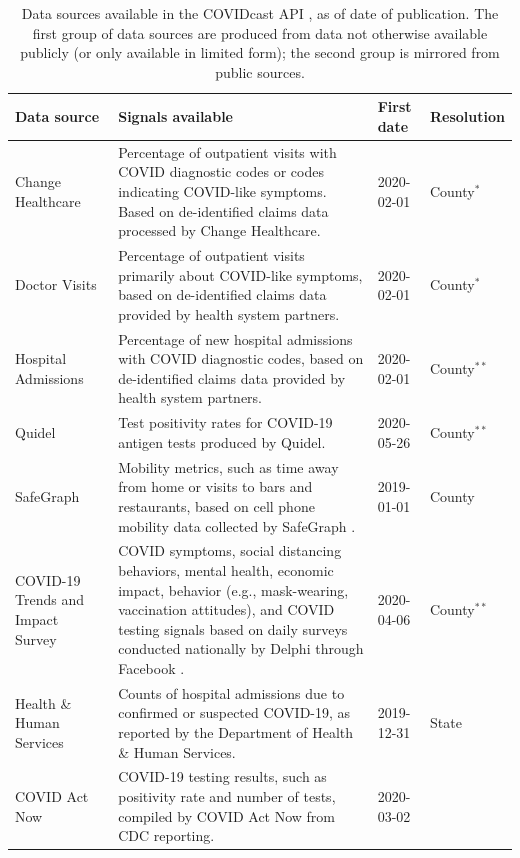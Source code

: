 \documentclass[11pt]{article}
\begin{document}
\begin{landscape}
\begin{table}[t]
\centering
\caption{Data sources available in the COVIDcast API \cite{CovidcastAPI}, as of
  date of publication. The first group of data sources are produced from data
  not otherwise available publicly (or only available in limited form); the
  second group is mirrored from public sources.}
\small
\begin{tabular}{>{\raggedright}p{1.2in} p{4.0in} l >{\raggedright\arraybackslash}p{0.5in}}
  \toprule
  \textbf{Data source} & \textbf{Signals available} & \textbf{First date} &
\textbf{Resolution} \\\midrule
  Change Healthcare & Percentage of outpatient visits with COVID diagnostic
codes or codes indicating COVID-like symptoms. Based on de-identified claims
data processed by Change Healthcare. & 2020-02-01 & County$^*$ \\
  Doctor Visits & Percentage of outpatient visits primarily about COVID-like
symptoms, based on de-identified claims data provided by health system
partners. & 2020-02-01 & County$^*$ \\
  Hospital Admissions & Percentage of new hospital admissions with COVID
diagnostic codes, based on de-identified claims data provided by health system
partners. & 2020-02-01 & County$^{**}$\\
  Quidel & Test positivity rates for COVID-19 antigen tests produced by
Quidel. & 2020-05-26 & County$^{**}$ \\
  SafeGraph & Mobility metrics, such as time away from home or visits to bars
and restaurants, based on cell phone mobility data collected by SafeGraph
\cite{SafeGraphSocial, SafeGraphPatterns}. & 2019-01-01 & County \\
  COVID-19 Trends and Impact Survey & COVID symptoms, social distancing
behaviors, mental health, economic impact, behavior (e.g., mask-wearing,
vaccination attitudes), and COVID testing signals based on daily surveys
conducted nationally by Delphi through Facebook \cite{Salomon:2021,
Kreuter:2020}. & 2020-04-06 & County$^{**}$ \\
  \midrule
  Health \& Human Services & Counts of hospital admissions due to confirmed or
suspected COVID-19, as reported by the Department of Health \& Human Services. &
2019-12-31 & State \\
  COVID Act Now & COVID-19 testing results, such as positivity rate and number
of tests, compiled by COVID Act Now from CDC reporting. & 2020-03-02 &

\end{tabular}
\end{table}
\end{landscape}
\end{document}
